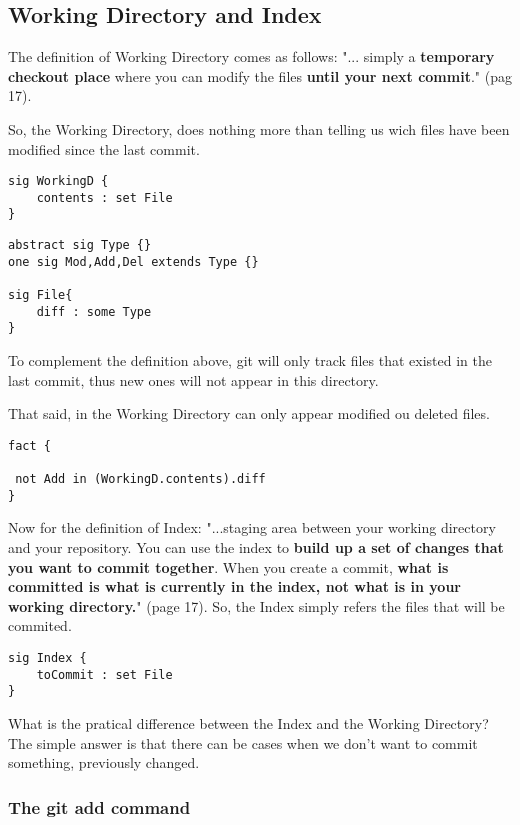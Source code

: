 \subsection{Working Directory and Index}


The definition of Working Directory comes as follows:
"... simply a {\bf temporary checkout place} where you can 
modify the files {\bf until your next commit}."
\cite{gitComm} (pag 17). \par
So,
the Working Directory, does nothing more than telling
us wich files have been modified since the last commit.

\begin{lstlisting}
sig WorkingD {
	contents : set File
}
\end{lstlisting}

\begin{lstlisting}
abstract sig Type {}
one sig Mod,Add,Del extends Type {}

sig File{
	diff : some Type	
}
\end{lstlisting}

To complement the definition above, git will only
track files that existed in the last commit, thus
new ones will not appear in this directory. \par 
That said, in the Working Directory can only appear
modified ou deleted files. \par

\begin{lstlisting}
fact {

 not Add in (WorkingD.contents).diff
}
\end{lstlisting}
Now for the definition of Index:
"...staging area between your working directory and your
repository. You can use the index to {\bf build up a set of 
changes that you want to commit together}. When you create
a commit, {\bf what is committed is what is currently in the
index, not what is in your working directory.}"
\cite{gitComm} (page 17). So, the Index simply refers the files
that will be commited.

\begin{lstlisting}
sig Index {
	toCommit : set File
}
\end{lstlisting}

What is the pratical difference between the Index and the Working
Directory? The simple answer is that there can be cases when we don't want
to commit something, previously changed.

\subsubsection{The git add command}

